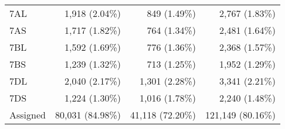 \begin{table}
\begin{localsize}{10}{12}
\begin{tabular}{lrrr}
 \midrule
 7AL                     & 1,918 (2.04\%)   & 849 (1.49\%)            & 2,767 (1.83\%)     \\
 7AS                     & 1,717 (1.82\%)   & 764 (1.34\%)            & 2,481 (1.64\%)     \\
 7BL                     & 1,592 (1.69\%)   & 776 (1.36\%)            & 2,368 (1.57\%)     \\
 7BS                     & 1,239 (1.32\%)   & 713 (1.25\%)            & 1,952 (1.29\%)     \\
 7DL                     & 2,040 (2.17\%)   & 1,301 (2.28\%)          & 3,341 (2.21\%)     \\
 7DS                     & 1,224 (1.30\%)   & 1,016 (1.78\%)          & 2,240 (1.48\%)     \\
 \midrule
 Assigned                & 80,031 (84.98\%) & 41,118 (72.20\%)        & 121,149 (80.16\%)  \\
\bottomrule
\end{tabular}
\end{localsize}
\end{table}